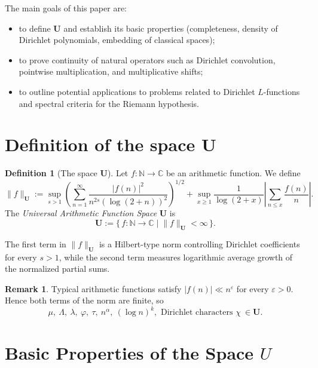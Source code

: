 \documentclass[11pt,a4paper]{article}
\theoremstyle{plain}
\theoremstyle{definition}
\newtheorem{definition}[theorem]{Definition}
\newtheorem{remark}[theorem]{Remark}
\theoremstyle{remark}
\begin{document}
	The main goals of this paper are:
	\begin{itemize}
		\item to define $\mathbf{U}$ and establish its basic properties 
		(completeness, density of Dirichlet polynomials, 
		embedding of classical spaces);
		\item to prove continuity of natural operators such as 
		Dirichlet convolution, pointwise multiplication,
		and multiplicative shifts;
		\item to outline potential applications to problems related 
		to Dirichlet $L$-functions and spectral criteria for
		the Riemann hypothesis.
	\end{itemize}
	
	\section{Definition of the space $\mathbf{U}$}
	
	\begin{definition}[The space $\mathbf{U}$]
		Let $f:\mathbb N\to\mathbb C$ be an arithmetic function.
		We define
		\[
		\|f\|_{\mathbf{U}}
		:=
		\sup_{s>1}
		\left(
		\sum_{n=1}^{\infty}
		\frac{|f(n)|^{2}}{n^{2s}(\log(2+n))^{2}}
		\right)^{1/2}
		+ 
		\sup_{x\ge1}
		\frac{1}{\log(2+x)}
		\left|
		\sum_{n\le x} \frac{f(n)}{n}
		\right|.
		\]
		The \emph{Universal Arithmetic Function Space} $\mathbf{U}$ is
		\[
		\mathbf{U}
		:=\bigl\{\, f:\mathbb N\to\mathbb C \;\big|\;
		\|f\|_{\mathbf{U}}<\infty \,\bigr\}.
		\]
	\end{definition}
	
	The first term in $\|f\|_{\mathbf{U}}$ is a Hilbert-type norm controlling
	Dirichlet coefficients for every $s>1$, while the second term measures
	logarithmic average growth of the normalized partial sums.
	
	\begin{remark}
		Typical arithmetic functions satisfy $|f(n)|\ll n^{\varepsilon}$ for every $\varepsilon>0$.
		Hence both terms of the norm are finite, so
		\[
		\mu,\ \Lambda,\ \lambda,\ \varphi,\ \tau,\ n^\alpha,\ (\log n)^k,
		\text{ Dirichlet characters } \chi
		\ \in \mathbf{U}.
		\]
	\end{remark}
	
\section{Basic Properties of the Space $U$}
\end{document}
